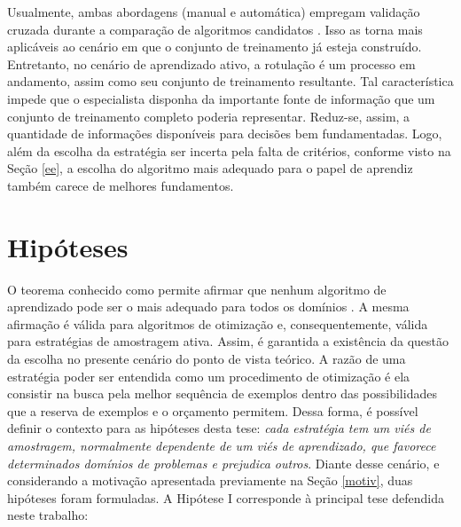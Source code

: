 Usualmente, ambas abordagens (manual e automática) empregam validação cruzada durante a comparação de algoritmos candidatos \cite{conf/pakdd/BouckaertF04,books/daglib/0022052}.
Isso as torna mais aplicáveis ao cenário em que o conjunto de treinamento já esteja construído.
Entretanto, no cenário de aprendizado ativo, a rotulação é um processo em andamento, assim como seu conjunto de treinamento resultante.
Tal característica impede que o especialista disponha da importante fonte de informação que um conjunto de treinamento completo poderia representar.
Reduz-se, assim, a quantidade de informações disponíveis para decisões bem fundamentadas.
Logo, além da escolha da estratégia ser incerta pela falta de critérios, conforme visto na Seção \ref{ee}, a escolha do algoritmo mais adequado para o papel de aprendiz também carece de melhores fundamentos.

\section{Hipóteses}\label{hipoteses}
O teorema conhecido como  permite afirmar que nenhum algoritmo de aprendizado pode ser o mais adequado para todos os domínios \cite{conf/icml/Schaffer94}.
A mesma afirmação é válida para algoritmos de otimização \cite{journals/tec/DolpertM97} e, consequentemente, válida para estratégias de amostragem ativa.
Assim, é garantida a existência da questão da escolha no presente cenário do ponto de vista teórico.
A razão de uma estratégia poder ser entendida como um procedimento de otimização é ela consistir na busca pela melhor sequência de exemplos dentro das possibilidades que a reserva de exemplos e o orçamento permitem.
Dessa forma, é possível definir o contexto para as hipóteses desta tese:
\textit{cada estratégia tem um viés de amostragem, normalmente dependente de um viés de aprendizado, que favorece determinados domínios de problemas e prejudica outros}.
Diante desse cenário, e considerando a motivação apresentada previamente
na Seção \ref{motiv}, duas hipóteses foram formuladas.
A Hipótese I corresponde à principal tese defendida neste trabalho:

\noindent{}\\

